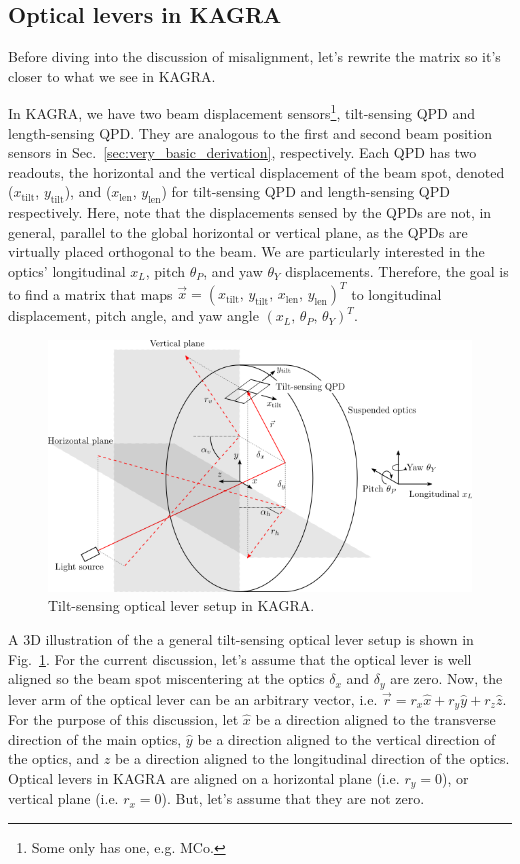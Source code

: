 \subsection{Optical levers in KAGRA}
Before diving into the discussion of misalignment, let's rewrite the matrix so it's closer to what we see in KAGRA.

In KAGRA, we have two beam displacement sensors\footnote{Some only has one, e.g. MCo.}, tilt-sensing QPD and length-sensing QPD. They are analogous to the first and second beam position sensors in Sec.~\ref{sec:very_basic_derivation}, respectively.
Each QPD has two readouts, the horizontal and the vertical displacement of the beam spot, denoted ($x_\mathrm{tilt}$, $y_\mathrm{tilt}$), and ($x_\mathrm{len}$, $y_\mathrm{len}$) for tilt-sensing QPD and length-sensing QPD respectively.
Here, note that the displacements sensed by the QPDs are not, in general, parallel to the global horizontal or vertical plane, as the QPDs are virtually placed orthogonal to the beam.
We are particularly interested in the optics' longitudinal $x_L$, pitch $\theta_P$, and yaw $\theta_Y$ displacements.
Therefore, the goal is to find a matrix that maps $\vec{x}=\left(x_\mathrm{tilt},\, y_\mathrm{tilt},\, x_\mathrm{len},\, y_\mathrm{len}\right)^T$ to longitudinal displacement, pitch angle, and yaw angle $\left(x_L,\, \theta_P,\, \theta_Y\right)^T$.

\begin{figure}[!h]
	\centering
	\includegraphics[width=0.7\linewidth]{figures/kagra_optical_lever_3d}
	\caption{Tilt-sensing optical lever setup in KAGRA.}
	\label{fig:kagraopticallever3d}
\end{figure}

A 3D illustration of the a general tilt-sensing optical lever setup is shown in Fig.~\ref{fig:kagraopticallever3d}.
For the current discussion, let's assume that the optical lever is well aligned so the beam spot miscentering at the optics $\delta_x$ and $\delta_y$ are zero.
Now, the lever arm of the optical lever can be an arbitrary vector, i.e. $\vec{r}=r_x\hat{x}+r_y\hat{y}+r_z\hat{z}$.
For the purpose of this discussion, let $\hat{x}$ be a direction aligned to the transverse direction of the main optics, $\hat{y}$ be a direction aligned to the vertical direction of the optics, and $\hat{z}$ be a direction aligned to the longitudinal direction of the optics.
Optical levers in KAGRA are aligned on a horizontal plane (i.e. $r_y=0$), or vertical plane (i.e. $r_x=0$).
But, let's assume that they are not zero.

